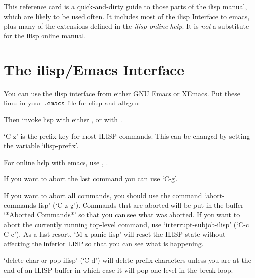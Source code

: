 This reference card is a quick-and-dirty guide to those parts of the
ilisp manual, which are likely to be used often.
It includes most of the ilisp Interface to emacs, plus many of the
extensions defined in the {\it ilisp online help}.  It is {\it not} a
substitute for the ilisp online manual.

\section{The ilisp/Emacs Interface }

You can use the ilisp interface from either GNU Emacs or XEmacs.
Put these lines in your {\tt .emacs} file for clisp and allegro:


\hskip 25pt 



\hskip 25pt 



\hskip 25pt 


Then invoke lisp with either ,
or with .

`C-z' is the prefix-key for most ILISP commands. This can be changed by
setting the variable `ilisp-prefix'.

For online help with emacs, use , .


If you want to abort the last command you can use `C-g'.

If you want to abort all commands, you should use the command
`abort-commands-lisp' (`C-z g').  Commands that are aborted will be put
in the buffer `*Aborted Commands*' so that you can see what was
aborted.  If you want to abort the currently running top-level command,
use `interrupt-subjob-ilisp' (`C-c C-c').  As a last resort, `M-x
panic-lisp' will reset the ILISP state without affecting the inferior
LISP so that you can see what is happening.

   `delete-char-or-pop-ilisp' (`C-d') will delete prefix characters
unless you are at the end of an ILISP buffer in which case it will pop
one level in the break loop.

